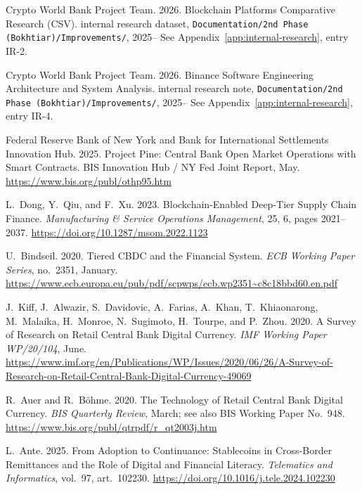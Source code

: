 \documentclass[12pt,a4paper]{report}
\begin{document}
{\begin{enumerate}[label={[\arabic*]}]
\item Crypto World Bank Project Team. 2026. Blockchain Platforms Comparative Research (CSV). internal research dataset, \texttt{Documentation/2nd Phase (Bokhtiar)/Improvements/}, 2025-- See Appendix~\ref{app:internal-research}, entry IR-2.

\item Crypto World Bank Project Team. 2026. Binance Software Engineering Architecture and System Analysis. internal research note, \texttt{Documentation/2nd Phase (Bokhtiar)/Improvements/}, 2025-- See Appendix~\ref{app:internal-research}, entry IR-4.

\item Federal Reserve Bank of New York and Bank for International Settlements Innovation Hub. 2025. Project Pine: Central Bank Open Market Operations with Smart Contracts. BIS Innovation Hub / NY Fed Joint Report, May. \url{https://www.bis.org/publ/othp95.htm}

\item L.~Dong, Y.~Qiu, and F.~Xu. 2023. Blockchain-Enabled Deep-Tier Supply Chain Finance. \emph{Manufacturing \& Service Operations Management}, 25, 6, pages 2021--2037. \url{https://doi.org/10.1287/msom.2022.1123}

\item U.~Bindseil. 2020. Tiered CBDC and the Financial System. \emph{ECB Working Paper Series}, no.~2351, January. \url{https://www.ecb.europa.eu/pub/pdf/scpwps/ecb.wp2351~c8c18bbd60.en.pdf}

\item J.~Kiff, J.~Alwazir, S.~Davidovic, A.~Farias, A.~Khan, T.~Khiaonarong, M.~Malaika, H.~Monroe, N.~Sugimoto, H.~Tourpe, and P.~Zhou. 2020. A Survey of Research on Retail Central Bank Digital Currency. \emph{IMF Working Paper WP/20/104}, June. \url{https://www.imf.org/en/Publications/WP/Issues/2020/06/26/A-Survey-of-Research-on-Retail-Central-Bank-Digital-Currency-49069}

\item R.~Auer and R.~B\"{o}hme. 2020. The Technology of Retail Central Bank Digital Currency. \emph{BIS Quarterly Review}, March; see also BIS Working Paper No.~948. \url{https://www.bis.org/publ/qtrpdf/r_qt2003j.htm}

\item L.~Ante. 2025. From Adoption to Continuance: Stablecoins in Cross-Border Remittances and the Role of Digital and Financial Literacy. \emph{Telematics and Informatics}, vol.~97, art.~102230. \url{https://doi.org/10.1016/j.tele.2024.102230}


\end{enumerate}}
\end{document}
